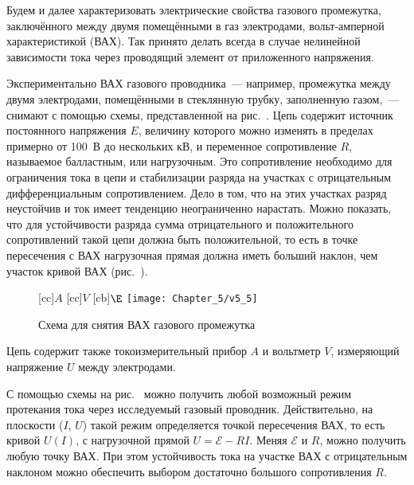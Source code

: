 Будем и далее характеризовать электрические свойства газового промежутка, заключённого между двумя помещёнными в газ
электродами, вольт-амперной характеристикой (ВАХ). Так принято делать всегда в случае нелинейной зависимости тока через
проводящий элемент от приложенного напряжения.

Экспериментально ВАХ газового проводника~--- например, промежутка между двумя электродами, помещёнными в стеклянную
трубку, заполненную газом,~--- снимают с помощью схемы, представленной на рис.~. Цепь содержит источник постоянного
напряжения $E$, величину которого можно изменять в пределах примерно от 100~В до нескольких кВ, и переменное
сопротивление $R$, называемое балластным, или нагрузочным. Это сопротивление необходимо для ограничения тока в цепи и
стабилизации разряда на участках с отрицательным дифференциальным сопротивлением. Дело в том, что на этих участках
разряд неустойчив и ток имеет тенденцию неограниченно нарастать. Можно показать, что для устойчивости разряда сумма
отрицательного и положительного сопротивлений такой цепи должна быть положительной, то есть в точке пересечения с ВАХ
нагрузочная прямая должна иметь больший наклон, чем участок кривой ВАХ (рис.~).

\begin{figure}[h!]
	\centering
	[cc]{$A$}
	[cc]{$V$}
	[cb]{$\E$}
	\texttt{[image: Chapter\_5/v5\_5]}
	\caption{Схема для снятия ВАХ газового промежутка}
\end{figure}


Цепь содержит также токоизмерительный прибор $A$ и вольтметр $V$, измеряющий напряжение $U$ между электродами.

С помощью схемы на рис.~ можно получить любой возможный режим протекания тока через исследуемый газовый проводник.
Действительно, на плоскости ($I$, $U$) такой режим определяется точкой пересечения ВАХ, то есть кривой $U(I)$, с
нагрузочной прямой $U=\mathcal{E}-RI$. Меняя $\mathcal{E}$ и $R$, можно получить любую точку ВАХ. При этом устойчивость тока на участке
ВАХ с отрицательным наклоном можно обеспечить выбором достаточно большого сопротивления $R$.

